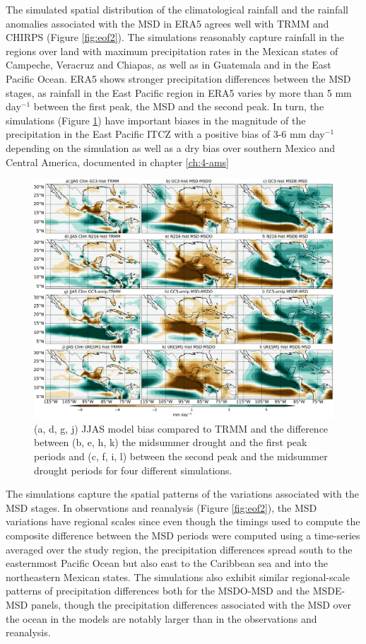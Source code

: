 The simulated spatial distribution of the climatological rainfall and the rainfall anomalies associated with the MSD in ERA5 agrees well with TRMM and CHIRPS (Figure \ref{fig:eof2}). The simulations reasonably capture rainfall in the regions over land with maximum precipitation rates in the Mexican states of Campeche, Veracruz and Chiapas, as well as in Guatemala and in the East Pacific Ocean. ERA5 shows stronger precipitation differences between the MSD stages, as rainfall in the East Pacific region in ERA5 varies by more than 5 mm day$^{-1}$ between the first peak, the MSD and the second peak. In turn, the simulations (Figure \ref{fig:model_pr}) have important biases in the magnitude of the  precipitation in the East Pacific ITCZ with a positive bias of 3-6 mm day$^{-1}$ depending on the simulation as well as a dry bias over southern Mexico and Central America, documented in chapter \ref{ch:4-ams}


\begin{figure}[t!]
\includegraphics[width=\linewidth]{figures/fig2obs_prmodels3}
\caption[Composite mean precipitation biases and seasonal variations]{ (a, d, g, j) JJAS model bias compared to TRMM and the difference between  (b, e, h, k)  the midsummer drought and the first peak periods and (c, f, i, l)  between the second peak and the midsummer drought periods for four different simulations.}
\label{fig:model_pr}
\end{figure} 
 
The simulations capture the spatial patterns of the variations associated with the MSD stages.
  In observations and reanalysis (Figure \ref{fig:eof2}), the MSD variations have regional scales since even though the timings used to compute the composite difference between the MSD periods were computed using a time-series averaged over the study region, the precipitation differences spread south to the easternmost Pacific Ocean but also east to the Caribbean sea and into the northeastern Mexican states. The simulations also exhibit similar regional-scale patterns of precipitation differences both for the MSDO-MSD and the MSDE-MSD panels, though the precipitation differences associated with the MSD over the ocean in the models are notably larger than in the observations and reanalysis.  
 
